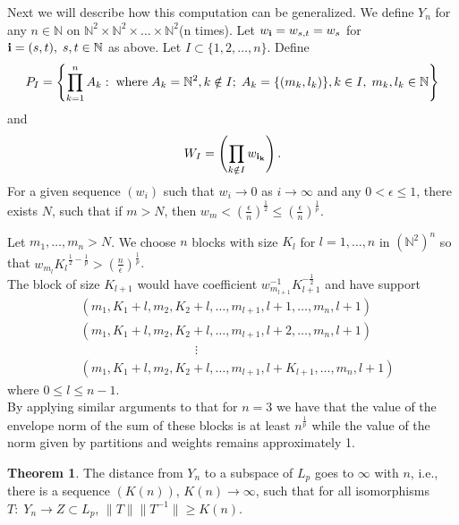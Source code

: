 \documentclass[12pt]{amsart}
\theoremstyle{definition}
\newtheorem{theorem}{Theorem}[section]
\theoremstyle{remark}
\numberwithin{equation}{section}
\begin{document}
Next we will describe how this computation can be generalized. We define
  $Y_n$ for any $n\in \mathbb{N}$  on 
${\mathbb{N}}^2\times {\mathbb{N}}^2\times \hdots \times
{\mathbb{N}}^2$(n times).
Let $w_{\bf{i}}= w_{s,t}=w_s$ for ${\bf{i}}=(s,t),\; s,t\in
  \mathbb{N}$ as above.
Let $I\subset \{1,2,\hdots,n\}$. Define\\
 $$\begin{displaystyle}P_I=\left\{
\prod_{k=1}^{n} A_k:\; \text{where}\; A_k={\mathbb{N}}^2,
k\notin I;\;A_k=\{(m_k, l_k)\}, k\in I, \; m_k, l_k \in
\mathbb{N}\right \}\end{displaystyle}$$
 and
$$\begin{displaystyle} W_I=\left(\prod_{k \notin I}w_{\bf{i_k}}
\right).\end{displaystyle}$$ 
For a given sequence $(w_i)$ such that
 $w_i \rightarrow 0$ as $i \rightarrow \infty$ and 
any $0 <\epsilon \le 1$, there exists $N$, such that
 if $m> N$, then 
$w_m<
\left(\frac{\epsilon}{n}\right)^{\frac 1 2}\le
\left(\frac{\epsilon}{n}\right)^{\frac 1 p}.
$ 

Let $m_1,\ldots, m_n > N$.
We choose $n$ blocks with size $K_l$ for $l=1,\ldots, n$ 
in $({\mathbb{N}}^2)^n$ so that 
$w_{m_l}{K_l}^{{\frac 1 2}-{\frac 1 p}}> (\frac n \epsilon )^{\frac 1 p}$.\\


The block of size $K_{l+1}$ would have coefficient
$w_{m_{l+1}}^{-1}K_{l+1}^{-\frac 1
2}$ and have support
\begin{align*}
&(m_1,K_1+l,m_2,K_2+l,\ldots, m_{l+1},l+1, \ldots,m_n, l+1)\\
&(m_1,K_1+l,m_2,K_2+l,\ldots, m_{l+1},l+2, \ldots,m_n, l+1)\\
&\phantom{xxxxxxxxxxxxxxxx}\vdots\\
&(m_1,K_1+l,m_2,K_2+l,\ldots, m_{l+1},l+K_{l+1}, \ldots,m_n, l+1)
\end{align*}
where $0\le l \le n-1$.\\

By applying similar arguments to that for $n=3$ 
we have that the value of 
 the envelope norm of the sum of these blocks is at least
$n^{\frac{1}{p}}$ while the value of the norm given 
by partitions and weights remains approximately 1.\\

 


\begin{theorem}
The distance from $Y_n$ to a subspace of $L_p$ goes to $\infty$ with
$n$, i.e., there is a sequence $(K(n))$, $K(n)\rightarrow \infty$,
such that for all isomorphisms $T: \; Y_n \rightarrow Z\subset L_p$, 
$\|T\|\|T^{-1}\|\geq K(n)$.
\end{theorem}
\end{document}

